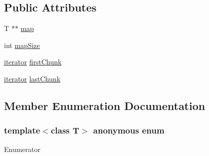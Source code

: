 \subsection*{Public Attributes}
\begin{DoxyCompactItemize}
\item 
T $\ast$$\ast$ \hyperlink{classprism_1_1containers_1_1_deque_data_a1760fab65f72a59bf121f84042409462}{map}
\item 
int \hyperlink{classprism_1_1containers_1_1_deque_data_a0fff90781042b14137e69017dc0d6479}{map\+Size}
\item 
\hyperlink{classprism_1_1containers_1_1_deque_iterator}{iterator} \hyperlink{classprism_1_1containers_1_1_deque_data_a20b372c923c7c2597f4a497435d34b42}{first\+Chunk}
\item 
\hyperlink{classprism_1_1containers_1_1_deque_iterator}{iterator} \hyperlink{classprism_1_1containers_1_1_deque_data_a8f635e8ceaa6bca00bec0f54079abea4}{last\+Chunk}
\end{DoxyCompactItemize}


\subsection{Member Enumeration Documentation}
\subsubsection[{\texorpdfstring{anonymous enum}{anonymous enum}}]{\setlength{\rightskip}{0pt plus 5cm}template$<$class T$>$ anonymous enum}\hypertarget{classprism_1_1containers_1_1_deque_data_aed08082decb29717e0d968fabb1f1ea4}{}\label{classprism_1_1containers_1_1_deque_data_aed08082decb29717e0d968fabb1f1ea4}
\begin{Desc}
\item[Enumerator]\par
\begin{description}
\item[{\em 
C\+H\+U\+N\+K\+\_\+\+S\+I\+ZE\hypertarget{classprism_1_1containers_1_1_deque_data_aed08082decb29717e0d968fabb1f1ea4a772861c6d49ff3131a0f2acd7e4b588b}{}\label{classprism_1_1containers_1_1_deque_data_aed08082decb29717e0d968fabb1f1ea4a772861c6d49ff3131a0f2acd7e4b588b}
}]\end{description}
\end{Desc}


